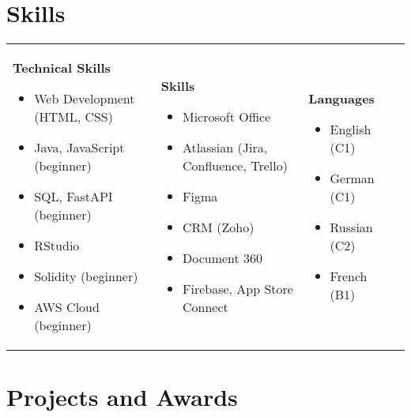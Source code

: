 \documentclass{ExpressiveResume}
\begin{document}
\section{Skills}
\noindent\begin{tabularx}{\textwidth}{@{}X@{}X@{}X@{}X@{}}
\textbf{Technical Skills}
\begin{itemize}
    \item Web Development (HTML, CSS)
    \item Java, JavaScript (beginner)
    \item SQL, FastAPI (beginner)
    \item RStudio
    \item Solidity (beginner)
    \item AWS Cloud (beginner)
\end{itemize}
&
\textbf{Skills}
\begin{itemize}
    \item Microsoft Office
    \item Atlassian (Jira, Confluence, Trello)
    \item Figma
    \item CRM (Zoho)
    \item Document 360
    \item Firebase, App Store Connect
\end{itemize}
&
\textbf{Languages}
\begin{itemize}
    \item English (C1)
    \item German (C1)
    \item Russian (C2)
    \item French (B1)
\end{itemize}
\end{tabularx}


\section{Projects and Awards}

\end{document}
